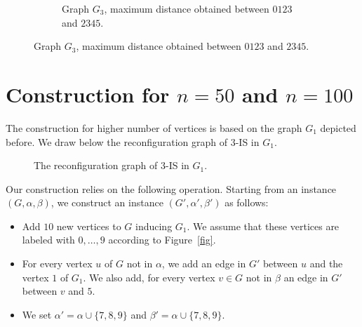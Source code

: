 \documentclass{article}
\begin{document}
\begin{figure}[!ht]
\begin{subfigure}[b]{0.5\linewidth}
  \centering

    \caption{Graph $G_3$, maximum distance obtained between $0123$ and $2345$.}
  \end{subfigure}
\end{figure}



\section{Construction for $n=50$ and $n=100$}
The construction for higher number of vertices is based on the graph $G_1$ depicted before. We draw below the reconfiguration graph of $3$-IS in $G_1$.

\begin{figure}[!ht]
  \centering
  \caption{The reconfiguration graph of $3$-IS in $G_1$.}
  \label{fig2}
\end{figure}

Our construction relies on the following operation. Starting from an instance $(G,\alpha,\beta)$, we construct an instance $(G',\alpha',\beta')$ as follows:
\begin{itemize}
\item Add $10$ new vertices to $G$ inducing $G_1$. We assume that these vertices are labeled with $0,\ldots,9$ according to Figure~\ref{fig}. 
\item For every vertex $u$ of $G$ not in $\alpha$, we add an edge in $G'$ between $u$ and the vertex $1$ of $G_1$. We also add, for every vertex $v \in G$ not in $\beta$ an edge in $G'$ between $v$ and $5$.
\item We set $\alpha'=\alpha\cup \{7,8,9\}$ and $\beta'=\alpha\cup\{7,8,9\}$.
\end{itemize}
\end{document}
